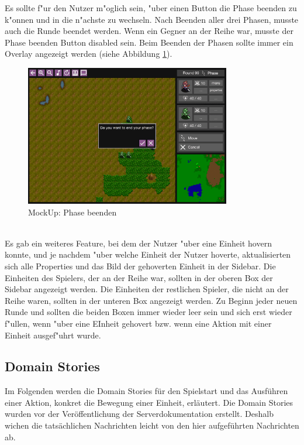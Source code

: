 \documentclass[12pt, titlepage]{scrartcl}
\newcounter{subsubsubsection}[subsubsection]
\begin{document}
			        Es sollte f"ur den Nutzer m"oglich sein, "uber einen Button die Phase beenden zu k"onnen und in die n"achste zu wechseln. Nach Beenden aller drei Phasen, musste auch die Runde beendet werden. Wenn ein Gegner an der Reihe war, musste der Phase beenden Button disabled sein. Beim Beenden der Phasen sollte immer ein Overlay angezeigt werden (siehe Abbildung \ref{Phase_End}). \\
			        \begin{figure}[H] 
    				    \centering
    				    \includegraphics[width=0.8\textwidth]{images/mockUps/EndPhase.png}
    				    \caption{MockUp: Phase beenden}
    				    \label{Phase_End}
			        \end{figure}
			        \ \\ Es gab ein weiteres Feature, bei dem der Nutzer "uber eine Einheit hovern konnte, und je nachdem "uber welche Einheit der Nutzer hoverte, aktualisierten sich alle Properties und das Bild der gehoverten Einheit in der Sidebar. Die Einheiten des Spielers, der an der Reihe war, sollten in der oberen Box der Sidebar angezeigt werden. Die Einheiten der restlichen Spieler, die nicht an der Reihe waren, sollten in der unteren Box angezeigt werden. Zu Beginn jeder neuen Runde und sollten die beiden Boxen immer wieder leer sein und sich erst wieder f"ullen, wenn "uber eine EInheit gehovert bzw. wenn eine Aktion mit einer Einheit ausgef"uhrt wurde.
		\subsection{Domain Stories}
		    Im Folgenden werden die Domain Stories f\"ur den Spielstart und das Ausf\"uhren einer Aktion, konkret die Bewegung einer Einheit, erl\"autert. Die Domain Stories wurden vor der Ver\"offentlichung der Serverdokumentation erstellt. Deshalb wichen die tats\"achlichen Nachrichten leicht von den hier aufgef\"uhrten Nachrichten ab. \\
\end{document}
